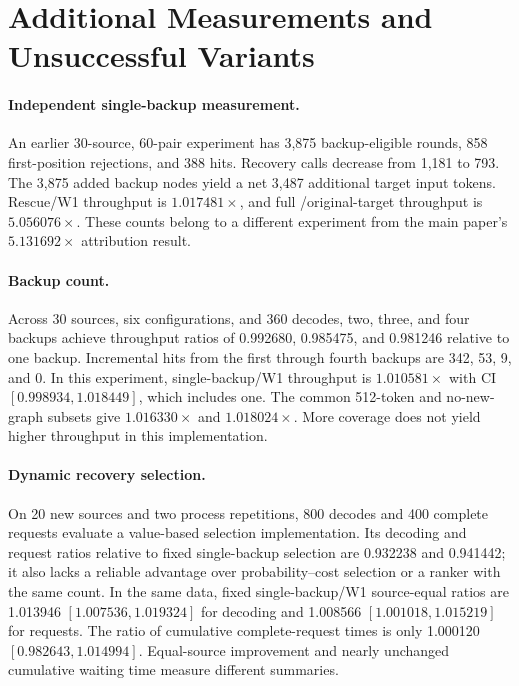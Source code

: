 \section{Additional Measurements and Unsuccessful Variants}
\label{app:additional}
\paragraph{Independent single-backup measurement.}
An earlier 30-source, 60-pair experiment has 3,875 backup-eligible rounds, 858 first-position rejections, and 388 hits. Recovery calls decrease from 1,181 to 793. The 3,875 added backup nodes yield a net 3,487 additional target input tokens. Rescue/W1 throughput is $1.017481\times$, and full \PF/original-target throughput is $5.056076\times$. These counts belong to a different experiment from the main paper's $5.131692\times$ attribution result.

\paragraph{Backup count.}
Across 30 sources, six configurations, and 360 decodes, two, three, and four backups achieve throughput ratios of 0.992680, 0.985475, and 0.981246 relative to one backup. Incremental hits from the first through fourth backups are 342, 53, 9, and 0. In this experiment, single-backup/W1 throughput is $1.010581\times$ with CI $[0.998934,1.018449]$, which includes one. The common 512-token and no-new-graph subsets give $1.016330\times$ and $1.018024\times$. More coverage does not yield higher throughput in this implementation.

\paragraph{Dynamic recovery selection.}
On 20 new sources and two process repetitions, 800 decodes and 400 complete requests evaluate a value-based selection implementation. Its decoding and request ratios relative to fixed single-backup selection are 0.932238 and 0.941442; it also lacks a reliable advantage over probability--cost selection or a ranker with the same count. In the same data, fixed single-backup/W1 source-equal ratios are 1.013946 $[1.007536,1.019324]$ for decoding and 1.008566 $[1.001018,1.015219]$ for requests. The ratio of cumulative complete-request times is only 1.000120 $[0.982643,1.014994]$. Equal-source improvement and nearly unchanged cumulative waiting time measure different summaries.

